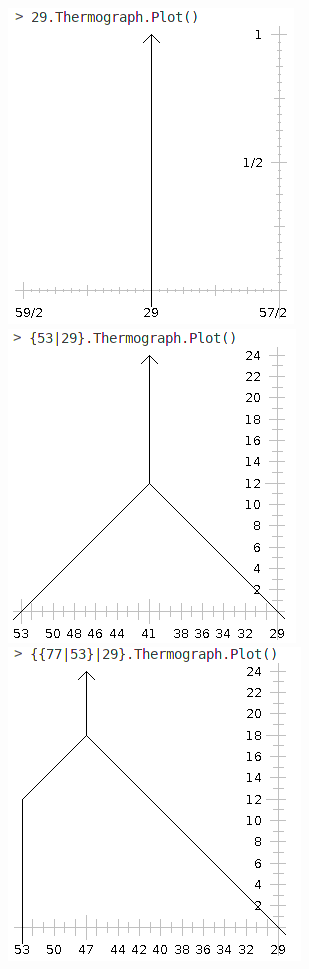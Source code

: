 \begin{figure}[H]
	\begin{center}
	\includegraphics[scale=0.5]{sections/strong_placement_games/g0L.png}
	\includegraphics[scale=0.5]{sections/strong_placement_games/g1L.png}\\
	\includegraphics[scale=0.5]{sections/strong_placement_games/g2L.png}

\end{center}
\end{figure}
